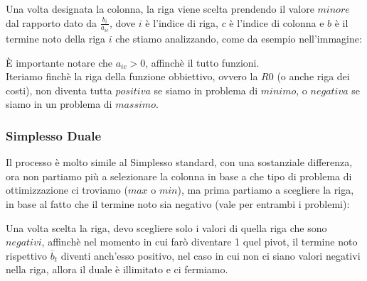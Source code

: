 \documentclass{article}
\begin{document}
Una volta designata la colonna, la riga viene scelta prendendo il valore $minore$ dal rapporto dato da $\frac{b_i}{a_{ic}}$, dove $i$ è l'indice di riga, $c$ è l'indice di colonna e $b$ è il termine noto della riga $i$ che stiamo analizzando, come da esempio nell'immagine:\\

\begin{center}
\end{center}

È importante notare che $a_{ic} > 0$, affinchè il tutto funzioni.\\
Iteriamo finchè la riga della funzione obbiettivo, ovvero la $R0$ (o anche riga dei costi), non diventa tutta $positiva$ se siamo in problema di $minimo$, o $negativa$ se siamo in un problema di $massimo$.

\subsubsection{Simplesso Duale}
Il processo è molto simile al Simplesso standard, con una sostanziale differenza, ora non partiamo più a selezionare la colonna in base a che tipo di problema di ottimizzazione ci troviamo ($max$ o $min$), ma prima partiamo a scegliere la riga, in base al fatto che il termine noto sia negativo (vale per entrambi i problemi):\\
\begin{center}
\end{center}

Una volta scelta la riga, devo scegliere solo i valori di quella riga che sono $negativi$, affinchè nel momento in cui farò diventare 1 quel pivot, il termine noto rispettivo $\overline{b}_t$ diventi anch'esso positivo, nel caso in cui non ci siano valori negativi nella riga, allora il duale è illimitato e ci fermiamo.\\
\end{document}
